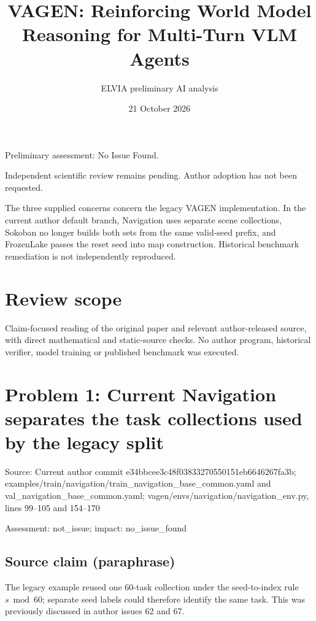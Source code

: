 \documentclass[11pt]{article}
\begin{document}
\title{VAGEN: Reinforcing World Model Reasoning for Multi-Turn VLM Agents}

\author{ELVIA preliminary AI analysis}\date{21 October 2026}\maketitle

Preliminary assessment: No Issue Found.\par

Independent scientific review remains pending. Author adoption has not been requested.

The three supplied concerns concern the legacy VAGEN implementation. In the current author default branch, Navigation uses separate scene collections, Sokoban no longer builds both sets from the same valid-seed prefix, and FrozenLake passes the reset seed into map construction. Historical benchmark remediation is not independently reproduced.

\section*{Review scope}

Claim-focused reading of the original paper and relevant author-released source, with direct mathematical and static-source checks. No author program, historical verifier, model training or published benchmark was executed.

\section*{Problem 1: Current Navigation separates the task collections used by the legacy split}

Source: Current author commit e34bbcee3c48f03833270550151eb6646267fa3b; examples/train/navigation/train\_navigation\_base\_common.yaml and val\_navigation\_base\_common.yaml; vagen/envs/navigation/navigation\_env.py, lines 99–105 and 154–170

Assessment: not\_issue; impact: no\_issue\_found

\subsection*{Source claim (paraphrase)}

The legacy example reused one \(60\)-task collection under the seed-to-index rule \(s\bmod60\); separate seed labels could therefore identify the same task. This was previously discussed in author issues 62 and 67.
\end{document}
